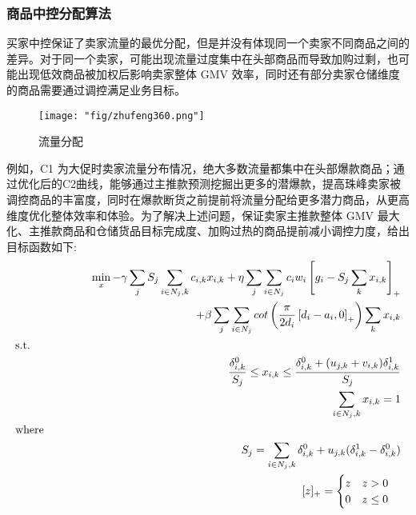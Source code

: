 \subsubsection{商品中控分配算法}
买家中控保证了卖家流量的最优分配，但是并没有体现同一个卖家不同商品之间的差异。对于同一个卖家，可能出现流量过度集中在头部商品而导致加购过剩，也可能出现低效商品被加权后影响卖家整体 GMV 效率，同时还有部分卖家仓储维度的商品需要通过调控满足业务目标。


\begin{figure}[!h]
	\centering
	\texttt{[image: "fig/zhufeng360.png"]}
	\caption{流量分配}
	\label{fig:zhufeng360}
\end{figure}

例如，C1 为大促时卖家流量分布情况，绝大多数流量都集中在头部爆款商品；通过优化后的C2曲线，能够通过主推款预测挖掘出更多的潜爆款，提高珠峰卖家被调控商品的丰富度，同时在爆款断货之前提前将流量分配给更多潜力商品，从更高维度优化整体效率和体验。为了解决上述问题，保证卖家主推款整体 GMV 最大化、主推款商品和仓储货品目标完成度、加购过热的商品提前减小调控力度，给出目标函数如下:
\begin{align}
\min_x - \gamma \sum_jS_j \sum_{i\in N_j,k} c_{i,k} x_{i,k}  + \eta \sum_j \sum_{i\in N_j} c_i w_i  \left [g_i - S_j \sum_k x_{i,k} \right]_{+} \\
+ \beta \sum_j \sum_{i \in N_j} cot \left ( \frac{\pi}{2d_i}\left[d_i-a_i,0\right]_+\right )\sum_k x_{i,k} \\
\leftline{s.t.} \\
\frac{\delta_{i,k}^{0}}{S_j} \leq x_{i,k} \leq \frac{\delta_{i,k}^0 + (u_{j,k} + v_{i,k}) \delta_{i,k}^1}{S_j} \\
\sum_{i \in N_j,k} x_{i,k}=1 \\
\leftline{where} \\
S_j=\sum_{i \in N_j,k} \delta_{i,k}^{0} + u_{j,k}(\delta_{i,k}^1-\delta_{i,k}^0) \\
[z]_+= \begin{cases}  
z \quad z>0 \\
0 \quad z \leq 0
\end{cases}
\end{align}

